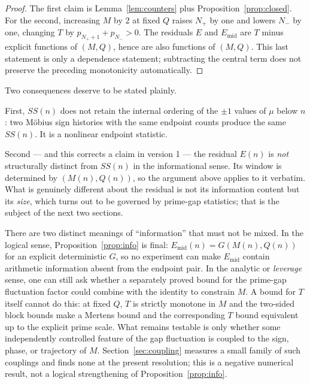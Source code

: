 \documentclass[11pt]{amsart}
\numberwithin{equation}{section}
\theoremstyle{plain}
\theoremstyle{definition}
\theoremstyle{remark}
\newcommand{\mob}{\mu}
\newcommand{\Mert}{M}
\newcommand{\Sq}{Q}
\begin{document}
\begin{proof}
The first claim is Lemma~\ref{lem:counters} plus
Proposition~\ref{prop:closed}. For the second, increasing $\Mert$ by $2$ at
fixed $\Sq$ raises $N_+$ by one and lowers $N_-$ by one, changing $T$ by
$p_{N_++1}+p_{N_-}>0$. The residuals $E$ and $E_{\mathrm{mid}}$ are $T$ minus explicit functions of
$(\Mert,\Sq)$, hence are also functions of $(\Mert,\Sq)$. This last statement
is only a dependence statement; subtracting the central term does not preserve the
preceding monotonicity automatically.
\end{proof}

Two consequences deserve to be stated plainly.

First, $SS(n)$ does not retain the internal ordering of the $\pm1$ values of
$\mob$ below $n$: two M\"obius sign histories with the same endpoint counts
produce the same $SS(n)$. It is a nonlinear endpoint statistic.

Second --- and this corrects a claim in version 1 --- the residual $E(n)$ is
\emph{not} structurally distinct from $SS(n)$ in the informational sense. Its
window is determined by $(\Mert(n),\Sq(n))$, so the argument above applies to it
verbatim. What is genuinely different about the residual is not its information
content but its \emph{size}, which turns out to be governed by prime-gap
statistics; that is the subject of the next two sections.

There are two distinct meanings of ``information'' that must not be mixed.
In the logical sense, Proposition~\ref{prop:info} is final:
$E_{\mathrm{mid}}(n)=G(\Mert(n),\Sq(n))$ for an explicit deterministic $G$, so
no experiment can make $E_{\mathrm{mid}}$ contain arithmetic information absent
from the endpoint pair. In the analytic or \emph{leverage} sense, one can still
ask whether a separately proved bound for the prime-gap fluctuation factor could
combine with the identity to constrain $\Mert$. A bound for $T$ itself cannot do
this: at fixed $\Sq$, $T$ is strictly monotone in $\Mert$ and the two-sided
block bounds make a Mertens bound and the corresponding $T$ bound equivalent up
to the explicit prime scale. What remains testable is only whether some
independently controlled feature of the gap fluctuation is coupled to the sign,
phase, or trajectory of $\Mert$. Section~\ref{sec:coupling} measures a small
family of such couplings and finds none at the present resolution; this is a
negative numerical result, not a logical strengthening of
Proposition~\ref{prop:info}.
\end{document}
